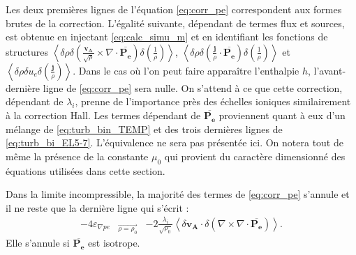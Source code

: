 Les deux premières lignes de l'équation \eqref{eq:corr_pe} correspondent aux formes brutes de la correction. L'égalité suivante, dépendant de termes flux et sources, est obtenue en injectant \eqref{eq:calc_simu_m} et en identifiant les fonctions de structures $\left<\delta \rho \delta \left( \frac{\boldsymbol{v_A} }{\sqrt{\rho}} \times \nabla \cdot \overline{\boldsymbol{P_{e}}}\right) \delta \left(\frac{1}{\rho} \right)\right>$, $\left<\delta \rho \delta \left( \frac{ \boldsymbol{j}}{\rho} \cdot \overline{\boldsymbol{P_{e}}}\right) \delta \left(\frac{1}{\rho} \right) \right>$ et $\left<\delta \rho \delta u_e \delta \left(\frac{\boldsymbol{j}}{\rho} \right)\right>$.  Dans le cas où l'on peut faire apparaître l'enthalpie $h$, l'avant-dernière ligne de \eqref{eq:corr_pe} sera nulle.  On s'attend à ce que cette correction, dépendant de $\lambda_i$, prenne de l'importance près des échelles ioniques similairement à la correction \acs{Hall}. Les termes dépendant de $\overline{\boldsymbol{P_{e}}}$ proviennent quant à eux d'un mélange de \eqref{eq:turb_bin_TEMP} et des trois dernières lignes de \eqref{eq:turb_bi_EL5-7}. L'équivalence ne sera pas présentée ici. On notera tout de même la présence de la constante $\mu_0$ qui provient du caractère dimensionné des équations utilisées dans cette section. 

Dans la limite incompressible, la majorité des termes de \eqref{eq:corr_pe} s'annule et il ne reste que la dernière ligne qui s'écrit : 
\begin{equation}
\label{eq:corr_hallpeinc} \boxed{
\begin{array}{lcl}
   -4 \varepsilon_{\nabla pe} &{}_{\overrightarrow{\rho = \rho_0}}& - 2 \frac{\lambda_i}{\sqrt{\rho_0}} \left< \delta \boldsymbol{v_A} \cdot \delta (\nabla \times \nabla \cdot \overline{\boldsymbol{P_{e}}}) \right> .
   \end{array}}
\end{equation} 
Elle s'annule si $\overline{\boldsymbol{P_{e}}}$ est isotrope. 

